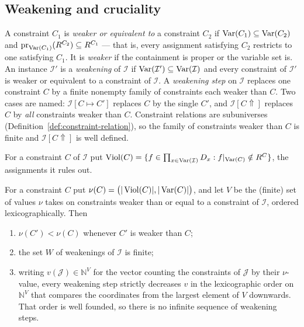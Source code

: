 \subsection{Weakening and cruciality}

\begin{definition}[Weakening]\label{def:weakening}
A constraint $C_{1}$ is \emph{weaker or equivalent to} a constraint $C_{2}$ if
$\operatorname{Var}(C_{1})\subseteq\operatorname{Var}(C_{2})$ and
$\operatorname*{pr}_{\operatorname{Var}(C_{1})}(R^{C_{2}})\subseteq R^{C_{1}}$ --- that is, every
assignment satisfying $C_{2}$ restricts to one satisfying $C_{1}$. It is
\emph{weaker} if the containment is proper or the variable set is. An
instance $\mathcal I'$ is a \emph{weakening} of $\mathcal I$ if
$\operatorname{Var}(\mathcal I')\subseteq\operatorname{Var}(\mathcal I)$ and every constraint of
$\mathcal I'$ is weaker or equivalent to a constraint of $\mathcal I$. A
\emph{weakening step} on $\mathcal I$ replaces one constraint $C$ by a finite
nonempty family of constraints each weaker than $C$. Two cases are named:
$\mathcal I[C\mapsto C']$ replaces $C$ by the single $C'$, and
$\mathcal I[C\Uparrow]$ replaces $C$ by \emph{all} constraints weaker than $C$.
Constraint relations are subuniverses
(Definition~\ref{def:constraint-relation}), so the family of constraints weaker
than $C$ is finite and $\mathcal I[C\Uparrow]$ is well defined.
\end{definition}

\begin{definition}\label{def:violation}
For a constraint $C$ of $\mathcal I$ put
$\operatorname{Viol}(C)=\{f\in\prod_{x\in\operatorname{Var}(\mathcal I)}D_{x}:
f|_{\operatorname{Var}(C)}\notin R^{C}\}$, the assignments it rules out.
\end{definition}

\begin{lemma}\label{lem:weakening-terminates}
For a constraint $C$ put $\nu(C)=\bigl(|\operatorname{Viol}(C)|,|\operatorname{Var}(C)|\bigr)$, and let $V$
be the (finite) set of values $\nu$ takes on constraints weaker than or equal to
a constraint of $\mathcal I$, ordered lexicographically. Then
\begin{enumerate}\alphlabels\tightlist
\item $\nu(C')<\nu(C)$ whenever $C'$ is weaker than $C$;
\item the set $W$ of weakenings of $\mathcal I$ is finite;
\item writing $v(\mathcal J)\in\mathbb N^{V}$ for the vector counting the
  constraints of $\mathcal J$ by their $\nu$-value, every weakening step
  strictly decreases $v$ in the lexicographic order on $\mathbb N^{V}$ that
  compares the coordinates from the largest element of $V$ downwards. That
  order is well founded, so there is no infinite sequence of weakening steps.
\end{enumerate}
\end{lemma}

